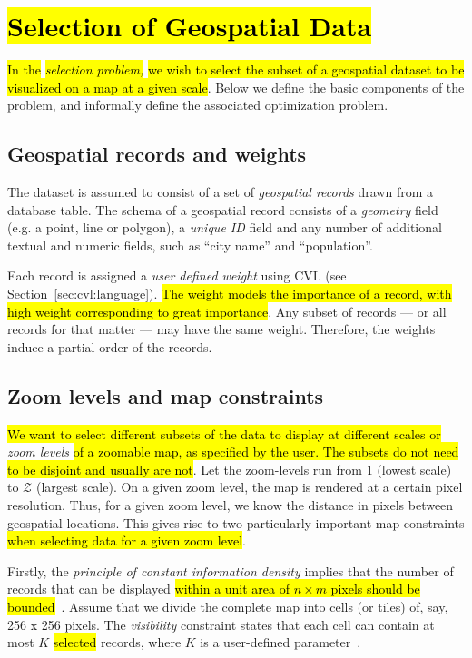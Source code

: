 \section{\hl{Selection of Geospatial Data}}
\label{sec:background}

\hl{In the }\emph{\hl{selection problem,}}\hl{ we wish to select the subset of a geospatial dataset to be visualized on a map at a given scale}. Below we define the basic components of the problem, and informally define the associated optimization problem.

\subsection{Geospatial records and weights}
\label{sec:records}

The dataset is assumed to consist of a set of \emph{geospatial records} drawn from a database table. The schema of a geospatial record consists of a \emph{geometry} field (e.g. a point, line or polygon), a \emph{unique ID} field and any number of additional textual and numeric fields, such as ``city name'' and ``population''.

Each record is assigned a \emph{user defined weight} using CVL (see Section~\ref{sec:cvl:language}). \hl{The weight models the importance of a record, with high weight corresponding to great importance}. Any subset of records --- or all records for that matter --- may have the same weight. Therefore, the weights induce a partial order of the records.

\subsection{Zoom levels and map constraints}
\label{sec:constraints}
\hl{We want to select different subsets of the data to display at different scales or }\emph{zoom levels}\hl{ of a zoomable map, as specified by the user. The subsets do not need to be disjoint and usually are not}. Let the zoom-levels run from 1 (lowest scale) to $\mathcal{Z}$ (largest scale). On a given zoom level, the map is rendered at a certain pixel resolution. Thus, for a given zoom level, we know the distance in pixels between geospatial locations. This gives rise to two particularly important map constraints \hl{when selecting data for a given zoom level}.

Firstly, the \emph{principle of constant information density} implies that the number of records that can be displayed \hl{within a unit area of $n \times m$ pixels should be bounded}~\cite{topfer1966principles}. Assume that we divide the complete map into cells (or tiles) of, say, 256 x 256 pixels. The \emph{visibility} constraint states that each cell can contain at most $K$ \hl{selected} records, where $K$ is a user-defined parameter~\cite{sarma2012fusiontables}.

